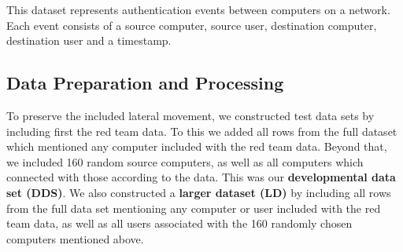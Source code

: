 \documentclass[sigconf]{acmart}
\begin{document}
This dataset represents authentication events between computers on a network.  Each event consists of a source computer, source user, destination computer, destination user and a timestamp.

\subsection{Data Preparation and Processing}

To preserve the included lateral movement, we constructed test data sets by including first the red team data.  To this we added all rows from the full dataset which mentioned any computer included with the red team data.  Beyond that, we included 160 random source computers, as well as all computers which connected with those according to the data.  This was our \textbf{developmental data set (DDS)}.  We also constructed a \textbf{larger dataset (LD)} by including all rows from the full data set mentioning any computer or user included with the red team data, as well as all users associated with the 160 randomly chosen computers mentioned above.

\end{document}
